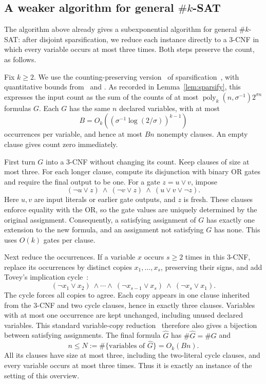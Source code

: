 \subsection{A weaker algorithm for general \texorpdfstring{$\#k$-SAT}{\#k-SAT}}
\label{subsec:preview-general-sat}
The algorithm above already gives a subexponential algorithm for
general $\#k$-SAT: after disjoint sparsification, we reduce each
instance directly to a $3$-CNF in which every variable occurs at
most three times. Both steps preserve the count, as follows.

Fix $k\ge2$. We use the counting-preserving version~\cite[Appendix~A]{DHMTW}
of sparsification~\cite{IPZ}, with quantitative bounds
from~\cite[Section~6]{CIP} and
\cite[Lemma~5.14 and equation~(5.4)]{CalabroThesis}.
As recorded in Lemma~\ref{lem:sparsify}, this expresses the input count as the sum of
the counts of at most
$\operatorname{poly}_k(n,\sigma^{-1})2^{\sigma n}$ formulas $G$.
Each $G$ has the same $n$ declared variables, with at most
\[
 B=O_k\!\left((\sigma^{-1}\log(2/\sigma))^{k-1}\right)
\]
occurrences per variable, and hence at most $Bn$ nonempty clauses.
An empty clause gives count zero immediately.

First turn $G$ into a $3$-CNF without changing its count. Keep
clauses of size at most three. For each longer clause, compute its
disjunction with binary OR gates and require the final output to
be one. For a gate $z=u\vee v$, impose
\[
 (\neg u\vee z)\ \wedge\ (\neg v\vee z)\ \wedge\
 (u\vee v\vee\neg z).
\]
Here $u,v$ are input literals or earlier gate outputs, and $z$ is
fresh. These clauses enforce equality with the OR, so the gate
values are uniquely determined by the original assignment.
Consequently, a satisfying assignment of $G$ has exactly one
extension to the new formula, and an assignment not satisfying
$G$ has none. This uses $O(k)$ gates per clause.

Next reduce the occurrences. If a variable $x$ occurs $s\ge2$
times in this $3$-CNF, replace its occurrences by distinct copies
$x_1,\ldots,x_s$, preserving their signs, and add Tovey's implication
cycle~\cite[p.~86]{Tov84}:
\[
 (\neg x_1\vee x_2)\ \wedge\cdots\wedge\
 (\neg x_{s-1}\vee x_s)\ \wedge\ (\neg x_s\vee x_1).
\]
The cycle forces all copies to agree. Each copy appears in one
clause inherited from the $3$-CNF and two cycle clauses, hence
in exactly three clauses. Variables with at most one occurrence
are kept unchanged, including unused declared variables.
This standard variable-copy reduction~\cite[Proposition~4.7]{Gol08}
therefore also gives a bijection between satisfying assignments.
The final formula $\widehat G$ has $\#\widehat G=\#G$ and
\[
 n\le N:=\#\{\text{variables of }\widehat G\}=O_k(Bn).
\]
All its clauses have size at most three, including the two-literal
cycle clauses, and every variable occurs at most three times.
Thus it is exactly an instance of the setting of this overview.

